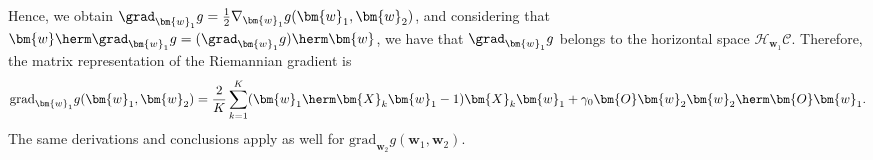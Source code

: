 
Hence, we obtain $\grad_{\bm{w}_1} g=\tfrac{1}{2}\nabla_{\bm{w}_1}g(\bm{w}_1,\bm{w}_2)$, and considering that $\bm{w}\herm\grad_{\bm{w}_1}g=(\grad_{\bm{w}_1} g)\herm\bm{w}$, we have that $\grad_{\bm{w}_1} g$ belongs to the horizontal space $\mathcal{H}_{\bm{w}_1}\mathcal{C}$. Therefore, the matrix representation of the Riemannian gradient is
\begin{equation}
\mathrm{grad}_{\bm{w}_1}g(\bm{w}_1,\bm{w}_2)=\frac{2}{K}\sum_{k=1}^K (\bm{w}_1\herm\bm{X}_k\bm{w}_1-1)\bm{X}_k\bm{w}_1 + \gamma_0\bm{O}\bm{w}_{2}\bm{w}_{2}\herm\bm{O}\bm{w}_1.
\end{equation}
The same derivations and conclusions apply as well for $\mathrm{grad}_{\bm{w}_2}g(\bm{w}_1,\bm{w}_2)$.

